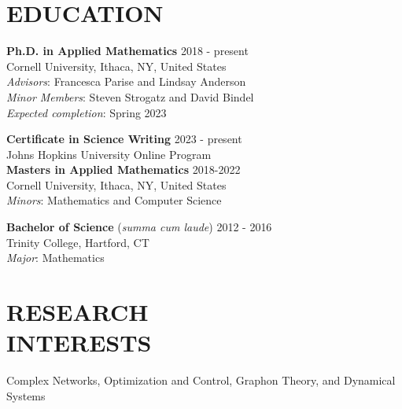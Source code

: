 \documentclass[margin]{res} %
\begin{document}
\begin{resume}

\section{EDUCATION}  
\textbf{Ph.D. in Applied Mathematics} \hfill 2018 - present\\
Cornell University, Ithaca, NY, United States\\
\textit{Advisors}: Francesca Parise and Lindsay Anderson \\
\textit{Minor Members}: Steven Strogatz and David Bindel\\
\textit{Expected completion}: Spring 2023
\smallskip

\textbf{Certificate in Science Writing} \hfill 2023 - present\\
Johns Hopkins University Online Program\\

\textbf{Masters in Applied Mathematics} \hfill 2018-2022\\
Cornell University, Ithaca, NY, United States\\
\textit{Minors}: Mathematics and Computer Science
\smallskip

\textbf{Bachelor of Science} (\textit{summa cum laude}) \hfill 2012 - 2016 \\
Trinity College, Hartford, CT\\
\textit{Major}: Mathematics\\



\section{RESEARCH \\ INTERESTS} 
Complex Networks, Optimization and Control, Graphon Theory, and Dynamical Systems 


\end{resume}
\end{document}
